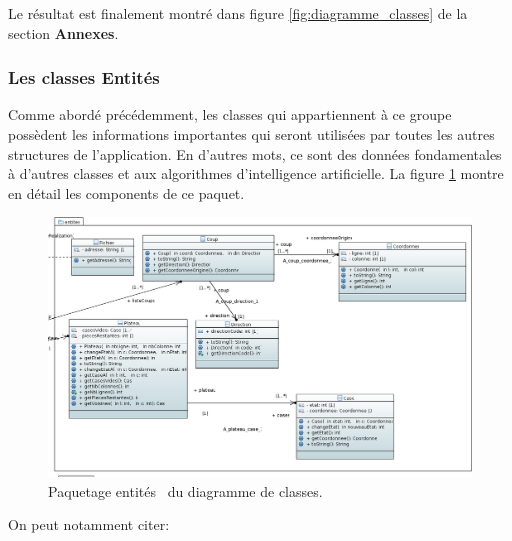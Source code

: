 \documentclass{article}
\begin{document}
\vspace{12pt}

Le résultat est finalement montré dans figure \ref{fig:diagramme_classes} de la
section \textbf{Annexes}.

\subsubsection{Les classes \og Entités \fg}

Comme abordé précédemment, les classes qui appartiennent à ce groupe possèdent
les informations importantes qui seront utilisées par toutes les autres
structures de l'application. En d'autres mots, ce sont des données fondamentales
à d'autres classes et aux algorithmes d'intelligence artificielle. La figure
\ref{fig:classes_entites} montre en détail les components de ce paquet.

\begin{figure}[h]
\centering
\includegraphics[scale=0.45]{images/entites}
\caption{Paquetage \og entités \fg ~du diagramme de classes.}
\label{fig:classes_entites}
\end{figure}

On peut notamment citer:

\vspace{12pt}
\end{document}
